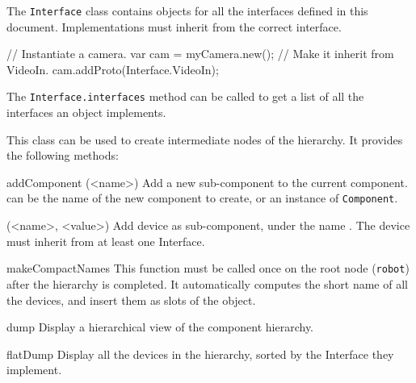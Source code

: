 \let\subsectionOrig\subsection
\let\subsection\subsectionObject

\subsection{Interface}

The \lstinline{Interface} class contains \us objects for all the interfaces
defined in this document. Implementations must inherit from the correct
interface.

\begin{urbiunchecked}
// Instantiate a camera.
var cam = myCamera.new();
// Make it inherit from VideoIn.
cam.addProto(Interface.VideoIn);
\end{urbiunchecked}

The \lstinline{Interface.interfaces} method can be called to get a list of
all the interfaces an object implements.

\subsection{Component}

This class can be used to create intermediate nodes of the hierarchy. It
provides the following methods:

\begin{urbiscriptapi}

\item[addComponent](<name>)%
  Add a new sub-component to the current component.  can
  be the name of the new component to create, or an instance of
  \lstinline{Component}.

\item[addDevice](<name>, <value>)%
  Add device  as sub-component, under the name . The
  device must inherit from at least one Interface.

\item[makeCompactNames]%
  This function must be called once on the root node (\lstinline{robot})
  after the hierarchy is completed.  It automatically computes the short
  name of all the devices, and insert them as slots of the
   object.

\item[dump]%
  Display a hierarchical view of the component hierarchy.

\item[flatDump]%
  Display all the devices in the hierarchy, sorted by the Interface
  they implement.
\end{urbiscriptapi}

